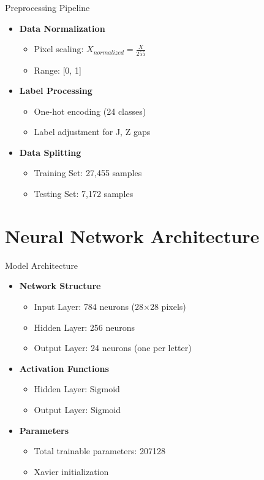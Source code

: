 \documentclass{beamer}
\begin{document}
\begin{frame}{Preprocessing Pipeline}
    \begin{itemize}
        \item \textbf{Data Normalization}
        \begin{itemize}
            \item Pixel scaling: $X_{normalized} = \frac{X}{255}$
            \item Range: [0, 1]
        \end{itemize}
        \item \textbf{Label Processing}
        \begin{itemize}
            \item One-hot encoding (24 classes)
            \item Label adjustment for J, Z gaps
        \end{itemize}
        \item \textbf{Data Splitting}
        \begin{itemize}
            \item Training Set: 27,455 samples
            \item Testing Set: 7,172 samples
        \end{itemize}
    \end{itemize}
\end{frame}

\section{Neural Network Architecture}

\begin{frame}{Model Architecture}
    \begin{itemize}
        \item \textbf{Network Structure}
        \begin{itemize}
            \item Input Layer: 784 neurons (28×28 pixels)
            \item Hidden Layer: 256 neurons
            \item Output Layer: 24 neurons (one per letter)
        \end{itemize}
        \item \textbf{Activation Functions}
        \begin{itemize}
            \item Hidden Layer: Sigmoid
            \item Output Layer: Sigmoid
        \end{itemize}
        \item \textbf{Parameters}
        \begin{itemize}
            \item Total trainable parameters: 207128
            \item Xavier initialization
        \end{itemize}
    \end{itemize}
\end{frame}
\end{document}
